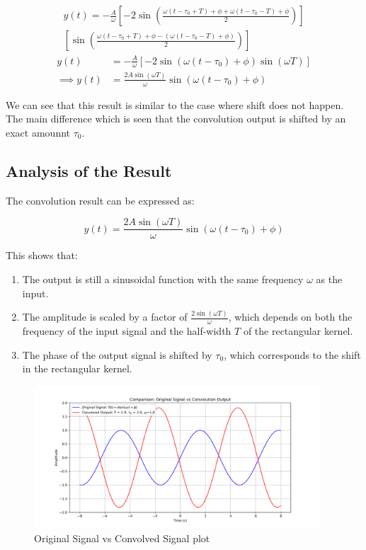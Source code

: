 \begin{multline*}
    y(t) = -\frac{A}{\omega}\left[-2\sin\left(\frac{\omega(t-\tau_0+T) + \phi + \omega(t-\tau_0-T) + \phi}{2}\right)\right] \\ \left[\sin\left(\frac{\omega(t-\tau_0+T) + \phi - (\omega(t-\tau_0-T) + \phi)}{2}\right)\right]
\end{multline*}
\begin{align*}
y(t) &= -\frac{A}{\omega}\left[-2\sin(\omega(t-\tau_0) + \phi)\sin(\omega T)\right] \\
    \implies y(t) &= \frac{2A\sin(\omega T)}{\omega}\sin(\omega(t-\tau_0) + \phi)
\end{align*}

We can see that this result is similar to the case where shift does not happen. The main difference which is seen that the convolution output is shifted by an exact amounnt $\tau_0$.

\subsection{Analysis of the Result}

The convolution result can be expressed as:

$$
y(t) = \frac{2A\sin(\omega T)}{\omega}\sin(\omega(t-\tau_0) + \phi)
$$

This shows that:

\begin{enumerate}
\item The output is still a sinusoidal function with the same frequency $\omega$ as the input.

\item The amplitude is scaled by a factor of $\frac{2\sin(\omega T)}{\omega}$, which depends on both the frequency of the input signal and the half-width $T$ of the rectangular kernel.

\item The phase of the output signal is shifted by $\tau_0$, which corresponds to the shift in the rectangular kernel.

\end{enumerate}

\begin{figure}[!ht]
    \begin{center}
        \includegraphics[width=0.95\textwidth]{codes/codes_sin_3_and_smoothening/figs/original_vs_convolved.png}
    \end{center}
    \caption{Original Signal vs Convolved Signal plot}
\end{figure}
\FloatBarrier

